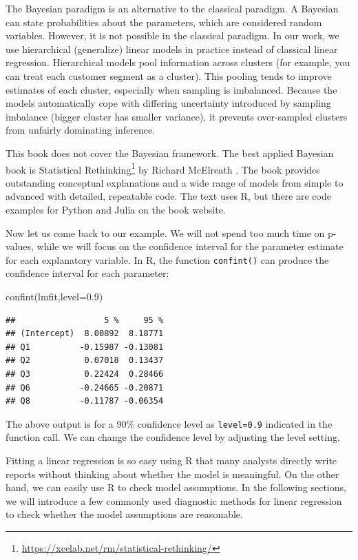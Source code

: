 \documentclass[
  12pt,
]{krantz}
\makeatletter
\newenvironment{Shaded}{\begin{snugshade}}{\end{snugshade}}
\newcommand{\AttributeTok}[1]{\textcolor[rgb]{0.61,0.61,0.61}{#1}}
\newcommand{\FloatTok}[1]{\textcolor[rgb]{0.06,0.06,0.06}{#1}}
\newcommand{\FunctionTok}[1]{\textcolor[rgb]{0,0,0}{#1}}
\newcommand{\NormalTok}[1]{#1}
\renewcommand{\href}[2]{#2\footnote{\url{#1}}}
\newenvironment{kframe}{%
\medskip{}
\setlength{\fboxsep}{.8em}
 \def\at@end@of@kframe{}%
 \ifinner\ifhmode%
  \def\at@end@of@kframe{\end{minipage}}%
  \begin{minipage}{\columnwidth}%
 \fi\fi%
 \def\FrameCommand##1{\hskip\@totalleftmargin \hskip-\fboxsep
 \colorbox{shadecolor}{##1}\hskip-\fboxsep
     \hskip-\linewidth \hskip-\@totalleftmargin \hskip\columnwidth}%
 \MakeFramed {\advance\hsize-\width
   \@totalleftmargin\z@ \linewidth\hsize
   \@setminipage}}%
 {\par\unskip\endMakeFramed%
 \at@end@of@kframe}
\renewenvironment{Shaded}{\begin{kframe}}{\end{kframe}}
\makeatother
\begin{document}
The Bayesian paradigm is an alternative to the classical paradigm. A Bayesian can state probabilities about the parameters, which are considered random variables. However, it is not possible in the classical paradigm. In our work, we use hierarchical (generalize) linear models in practice instead of classical linear regression. Hierarchical models pool information across clusters (for example, you can treat each customer segment as a cluster). This pooling tends to improve estimates of each cluster, especially when sampling is imbalanced. Because the models automatically cope with differing uncertainty introduced by sampling imbalance (bigger cluster has smaller variance), it prevents over-sampled clusters from unfairly dominating inference.

This book does not cover the Bayesian framework. The best applied Bayesian book is \href{https://xcelab.net/rm/statistical-rethinking/}{Statistical Rethinking} by Richard McElreath \citep{rethinking2020}. The book provides outstanding conceptual explanations and a wide range of models from simple to advanced with detailed, repeatable code. The text uses R, but there are code examples for Python and Julia on the book website.

Now let us come back to our example. We will not spend too much time on p-values, while we will focus on the confidence interval for the parameter estimate for each explanatory variable. In R, the function \texttt{confint()} can produce the confidence interval for each parameter:

\begin{Shaded}
\begin{Highlighting}[]
\FunctionTok{confint}\NormalTok{(lmfit,}\AttributeTok{level=}\FloatTok{0.9}\NormalTok{)}
\end{Highlighting}
\end{Shaded}

\begin{verbatim}
##                  5 %     95 %
## (Intercept)  8.00892  8.18771
## Q1          -0.15987 -0.13081
## Q2           0.07018  0.13437
## Q3           0.22424  0.28466
## Q6          -0.24665 -0.20871
## Q8          -0.11787 -0.06354
\end{verbatim}

The above output is for a 90\% confidence level as \texttt{level=0.9} indicated in the function call. We can change the confidence level by adjusting the level setting.

Fitting a linear regression is so easy using R that many analysts directly write reports without thinking about whether the model is meaningful. On the other hand, we can easily use R to check model assumptions. In the following sections, we will introduce a few commonly used diagnostic methods for linear regression to check whether the model assumptions are reasonable.
\end{document}
